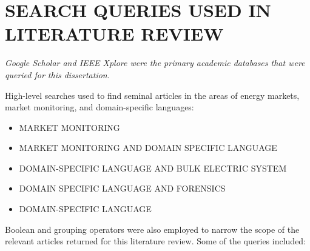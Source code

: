 %
%
%
%	 
%



\chapter{\uppercase {Search Queries used in Literature Review}}\label{appendix:B}

\noindent \textit{Google Scholar and IEEE Xplore were the primary academic databases that were queried for this dissertation.}
\newline

\noindent High-level searches used to find seminal articles in the areas of energy markets, market monitoring, and domain-specific languages:

\begin{itemize}
    \item \MakeUppercase{Market Monitoring}
    \item \MakeUppercase{Market Monitoring and Domain Specific Language}
    \item \MakeUppercase{Domain-Specific Language and Bulk Electric System}
    \item \MakeUppercase{Domain Specific Language and Forensics}
    \item \MakeUppercase{Domain-Specific Language}
\end{itemize}

\noindent Boolean and grouping operators were also employed to narrow the scope of the relevant articles returned for this literature review. Some of the queries included: 

